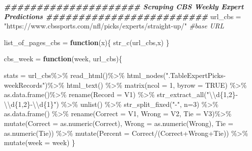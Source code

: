 \documentclass[
]{article}
\newenvironment{Shaded}{\begin{snugshade}}{\end{snugshade}}
\newcommand{\AttributeTok}[1]{\textcolor[rgb]{0.77,0.63,0.00}{#1}}
\newcommand{\CommentTok}[1]{\textcolor[rgb]{0.56,0.35,0.01}{\textit{#1}}}
\newcommand{\ConstantTok}[1]{\textcolor[rgb]{0.00,0.00,0.00}{#1}}
\newcommand{\ControlFlowTok}[1]{\textcolor[rgb]{0.13,0.29,0.53}{\textbf{#1}}}
\newcommand{\DecValTok}[1]{\textcolor[rgb]{0.00,0.00,0.81}{#1}}
\newcommand{\DocumentationTok}[1]{\textcolor[rgb]{0.56,0.35,0.01}{\textbf{\textit{#1}}}}
\newcommand{\FunctionTok}[1]{\textcolor[rgb]{0.00,0.00,0.00}{#1}}
\newcommand{\NormalTok}[1]{#1}
\newcommand{\OtherTok}[1]{\textcolor[rgb]{0.56,0.35,0.01}{#1}}
\newcommand{\SpecialCharTok}[1]{\textcolor[rgb]{0.00,0.00,0.00}{#1}}
\newcommand{\StringTok}[1]{\textcolor[rgb]{0.31,0.60,0.02}{#1}}
\begin{document}
\begin{Shaded}
\begin{Highlighting}[]
\DocumentationTok{\#\#\#\#\#\#\#\#\#\#\#\#\#\#\#\#\#\#\#\#\# Scraping CBS Weekly Expert Predictions \#\#\#\#\#\#\#\#\#\#\#\#\#\#\#\#\#\#\#\#\#\#\#\#\#}
\NormalTok{url\_cbs }\OtherTok{=} \StringTok{"https://www.cbssports.com/nfl/picks/experts/straight{-}up/"}  \CommentTok{\#base URL}

\NormalTok{list\_of\_pages\_cbs }\OtherTok{=} \ControlFlowTok{function}\NormalTok{(x)\{}
  \FunctionTok{str\_c}\NormalTok{(url\_cbs,x)}
\NormalTok{\}}

\NormalTok{cbs\_week }\OtherTok{=} \ControlFlowTok{function}\NormalTok{(week, url\_cbs)\{}
  
\NormalTok{  stats }\OtherTok{=}\NormalTok{ url\_cbs}\SpecialCharTok{\%\textgreater{}\%}
    \FunctionTok{read\_html}\NormalTok{()}\SpecialCharTok{\%\textgreater{}\%}
    \FunctionTok{html\_nodes}\NormalTok{(}\StringTok{".TableExpertPicks{-}weekRecords"}\NormalTok{)}\SpecialCharTok{\%\textgreater{}\%}
    \FunctionTok{html\_text}\NormalTok{() }\SpecialCharTok{\%\textgreater{}\%} 
    \FunctionTok{matrix}\NormalTok{(}\AttributeTok{ncol =} \DecValTok{1}\NormalTok{, }\AttributeTok{byrow =} \ConstantTok{TRUE}\NormalTok{) }\SpecialCharTok{\%\textgreater{}\%}
    \FunctionTok{as.data.frame}\NormalTok{()}\SpecialCharTok{\%\textgreater{}\%}
    \FunctionTok{rename}\NormalTok{(}\StringTok{\textasciigrave{}}\AttributeTok{Record}\StringTok{\textasciigrave{}} \OtherTok{=}\NormalTok{ V1) }\SpecialCharTok{\%\textgreater{}\%} 
    \FunctionTok{str\_extract\_all}\NormalTok{(}\StringTok{"}\SpecialCharTok{\textbackslash{}\textbackslash{}}\StringTok{d\{1,2\}{-}}\SpecialCharTok{\textbackslash{}\textbackslash{}}\StringTok{d\{1,2\}{-}}\SpecialCharTok{\textbackslash{}\textbackslash{}}\StringTok{d\{1\}"}\NormalTok{) }\SpecialCharTok{\%\textgreater{}\%} 
    \FunctionTok{unlist}\NormalTok{() }\SpecialCharTok{\%\textgreater{}\%} 
    \FunctionTok{str\_split\_fixed}\NormalTok{(}\StringTok{"{-}"}\NormalTok{, }\AttributeTok{n=}\DecValTok{3}\NormalTok{) }\SpecialCharTok{\%\textgreater{}\%} 
    \FunctionTok{as.data.frame}\NormalTok{() }\SpecialCharTok{\%\textgreater{}\%} 
    \FunctionTok{rename}\NormalTok{(}\StringTok{\textasciigrave{}}\AttributeTok{Correct}\StringTok{\textasciigrave{}} \OtherTok{=}\NormalTok{ V1, }\StringTok{\textasciigrave{}}\AttributeTok{Wrong}\StringTok{\textasciigrave{}} \OtherTok{=}\NormalTok{ V2, }\StringTok{\textasciigrave{}}\AttributeTok{Tie}\StringTok{\textasciigrave{}} \OtherTok{=}\NormalTok{ V3)}\SpecialCharTok{\%\textgreater{}\%} 
    \FunctionTok{mutate}\NormalTok{(}\AttributeTok{Correct =} \FunctionTok{as.numeric}\NormalTok{(Correct), }\AttributeTok{Wrong =} \FunctionTok{as.numeric}\NormalTok{(Wrong), }\AttributeTok{Tie =} \FunctionTok{as.numeric}\NormalTok{(Tie)) }\SpecialCharTok{\%\textgreater{}\%} 
    \FunctionTok{mutate}\NormalTok{(}\AttributeTok{Percent =}\NormalTok{ Correct}\SpecialCharTok{/}\NormalTok{(Correct}\SpecialCharTok{+}\NormalTok{Wrong}\SpecialCharTok{+}\NormalTok{Tie)) }\SpecialCharTok{\%\textgreater{}\%} 
    \FunctionTok{mutate}\NormalTok{(}\AttributeTok{week =}\NormalTok{ week)}
\NormalTok{\}}


\end{Highlighting}
\end{Shaded}
\end{document}
